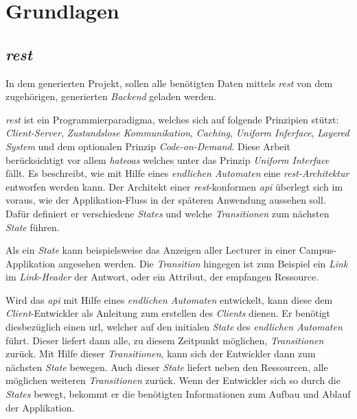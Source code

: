 \chapter{Grundlagen}\label{ch:basics}
\section{\textit{\acf{rest}}}\label{sec:rest}
In dem generierten Projekt, sollen alle benötigten Daten mittels \textit{\ac{rest}} von dem zugehörigen, generierten \textit{Backend} geladen werden. 

 \textit{\ac{rest}} \cite{rest_fielding} ist ein Programmierparadigma, welches sich auf folgende Prinzipien stützt: \textit{Client-Server}, \textit{Zustandslose Kommunikation}, \textit{Caching}, \textit{Uniform Inferface}, \textit{Layered System} und dem optionalen Prinzip \textit{Code-on-Demand}.
Diese Arbeit berücksichtigt vor allem \textit{\acf{hateoas}} welches unter das Prinzip \textit{Uniform Interface} fällt. Es beschreibt, wie mit Hilfe eines \textit{endlichen Automaten} eine \textit{\ac{rest}-Architektur} entworfen werden kann.
Der Architekt einer \textit{\ac{rest}}-konformen \textit{\acf{api}} überlegt sich im voraus, wie der Applikation-Fluss in der späteren Anwendung aussehen soll. Dafür definiert er verschiedene \textit{States} und welche \textit{Transitionen} zum nächsten \textit{State} führen.

Als ein \textit{State} kann beispielsweise das Anzeigen aller Lecturer in einer Campus-Applikation angesehen werden.
Die \textit{Transition} hingegen ist zum Beispiel ein \textit{Link} im \textit{Link-Header} der Antwort, oder ein Attribut, der empfangen Ressource. 

Wird das \textit{\ac{api}} mit Hilfe eines \textit{endlichen Automaten} entwickelt, kann diese dem \textit{Client}-Entwickler als Anleitung zum erstellen des \textit{Clients} dienen. Er benötigt diesbezüglich einen \acf{url}, welcher auf den initialen \textit{State} des \textit{endlichen Automaten} führt. Dieser liefert dann alle, zu diesem Zeitpunkt möglichen, \textit{Transitionen} zurück. Mit Hilfe dieser \textit{Transitionen}, kann sich der Entwickler dann zum nächsten \textit{State} bewegen. Auch dieser \textit{State} liefert neben den Ressourcen, alle möglichen weiteren \textit{Transitionen} zurück. 
Wenn der Entwickler sich so durch die \textit{States} bewegt, bekommt er die benötigten Informationen zum Aufbau und Ablauf der Applikation.

